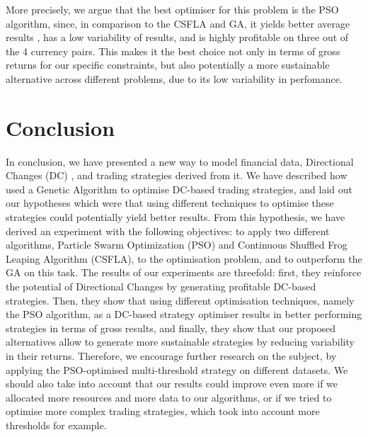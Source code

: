 \documentclass[conference]{IEEEtran}
\begin{document}
More precisely, we argue that the best optimiser for this problem is the PSO algorithm, since, in comparison to the CSFLA and GA, it yields better average results , has a low variability of results, and is highly profitable on three out of the 4 currency pairs. This makes it the best choice not only in terms of gross returns for our specific constraints, but also potentially a more sustainable alternative across different problems, due to its low variability in perfomance.


\section{Conclusion}\label{conclusion}

In conclusion, we have presented a new way to model financial data, Directional Changes (DC) , and trading strategies derived from it. We have described how \cite{kampouridis_otero_dc_ga} used a Genetic Algorithm to optimise DC-based trading strategies, and laid out our hypotheses which were that using different techniques to optimise these strategies could potentially yield better results. From this hypothesis, we have derived an experiment with the following objectives: to apply two different algorithms, Particle Swarm Optimization (PSO) and Continuous Shuffled Frog Leaping Algorithm (CSFLA), to the optimisation problem, and to outperform the GA on this task. The results of our experiments are threefold: first, they reinforce the potential of Directional Changes by generating profitable DC-based strategies. Then, they show that using different optimisation techniques, namely the PSO algorithm, as a DC-based strategy optimiser results in better performing strategies in terms of gross results, and finally, they show that our proposed alternatives allow to generate more sustainable strategies by reducing variability in their returns. Therefore, we encourage further research on the subject, by applying the PSO-optimised multi-threshold strategy on different datasets. We should also take into account that our results could improve even more if we allocated
more resources and more data to our algorithms, or if we tried to optimise more complex trading strategies, which took into account more thresholds for example.

\printbibliography %
\end{document}
